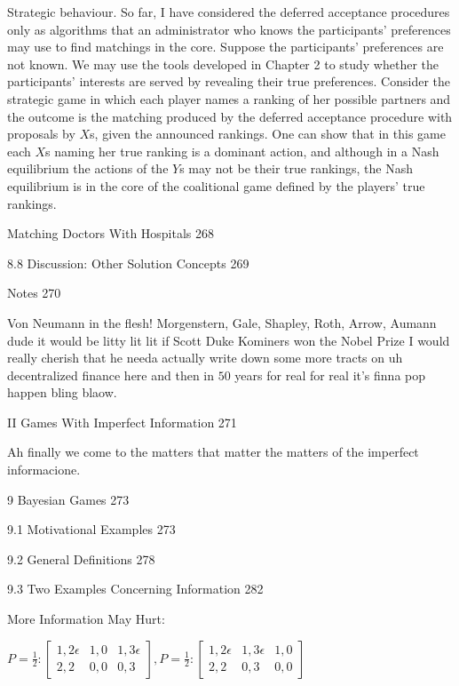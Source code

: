 Strategic behaviour. So far, I have considered the deferred acceptance procedures only as algorithms that an administrator who knows the participants' preferences may use to find matchings in the core. Suppose the participants' preferences are not known. We may use the tools developed in Chapter 2 to study whether the participants' interests are served by revealing their true preferences. Consider the strategic game in which each player names a ranking of her possible partners and the outcome is the matching produced by the deferred acceptance procedure with proposals by $X$s, given the announced rankings. One can show that in this game each $X$s naming her true ranking is a dominant action, and although in a Nash equilibrium the actions of the $Y$s may not be their true rankings, the Nash equilibrium is in the core of the coalitional game defined by the players' true rankings. 

Matching Doctors With Hospitals 268



8.8 Discussion: Other Solution Concepts 269



Notes 270

Von Neumann in the flesh! Morgenstern, Gale, Shapley, Roth, Arrow, Aumann dude it would be litty lit lit if Scott Duke Kominers won the Nobel Prize I would really cherish that he needa actually write down some more tracts on uh decentralized finance here and then in $50$ years for real for real it's finna pop happen bling blaow.

II Games With Imperfect Information 271

Ah finally we come to the matters that matter the matters of the imperfect informacione.

9 Bayesian Games 273



9.1 Motivational Examples 273



9.2 General Definitions 278



9.3 Two Examples Concerning Information 282

More Information May Hurt:

$
P=\frac{1}{2}:
\begin{bmatrix}
1,2\epsilon & 1,0 & 1,3\epsilon \\
2,2 & 0,0 & 0,3
\end{bmatrix}
,
P=\frac{1}{2}:
\begin{bmatrix}
1,2\epsilon & 1,3\epsilon & 1,0 \\
2,2 & 0,3 & 0,0
\end{bmatrix}
$

